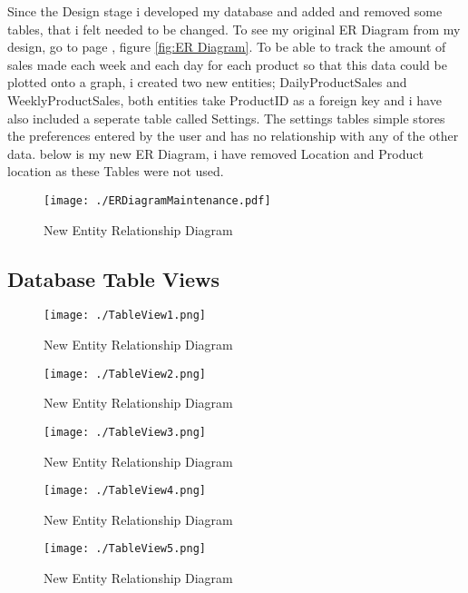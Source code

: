 Since the Design stage i developed my database and added and removed some tables, that i felt needed to be changed. To see my original ER Diagram from my design, go to page \pageref{fig:ER Diagram}, figure \ref{fig:ER Diagram}. To be able to track the amount of sales made each week and each day for each product so that this data could be plotted onto a graph, i created two new entities; DailyProductSales and WeeklyProductSales, both entities take ProductID as a foreign key and i have also included a seperate table called Settings. The settings tables simple stores the preferences entered by the user and has no relationship with any of the other data. below is my new ER Diagram, i have removed Location and Product location as these Tables were not used.

\begin{figure}[H]
    \texttt{[image: ./ERDiagramMaintenance.pdf]}
    \caption{New Entity Relationship Diagram} \label{fig:entity-relationship-maintenance}
\end{figure}

\subsection{Database Table Views}

\begin{figure}[H]
    \texttt{[image: ./TableView1.png]}
    \caption{New Entity Relationship Diagram} \label{fig:table-view-1}
\end{figure}

\begin{figure}[H]
    \texttt{[image: ./TableView2.png]}
    \caption{New Entity Relationship Diagram} \label{fig:table-view-2}
\end{figure}

\begin{figure}[H]
    \texttt{[image: ./TableView3.png]}
    \caption{New Entity Relationship Diagram} \label{fig:table-view-3}
\end{figure}

\begin{figure}[H]
    \texttt{[image: ./TableView4.png]}
    \caption{New Entity Relationship Diagram} \label{fig:table-view-4}
\end{figure}

\begin{figure}[H]
    \texttt{[image: ./TableView5.png]}
    \caption{New Entity Relationship Diagram} \label{fig:table-view-5}
\end{figure}

